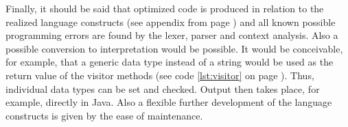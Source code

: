 Finally, it should be said that optimized code is produced in relation to the realized language constructs (see appendix from page \pageref{lst:eprogram}) and all known possible programming errors are found by the lexer, parser and context analysis. Also a possible conversion to interpretation would be possible. It would be conceivable, for example, that a generic data type instead of a string would be used as the return value of the visitor methods (see code \ref{lst:visitor} on page \pageref{lst:visitor}). Thus, individual data types can be set and checked. Output then takes place, for example, directly in Java. Also a flexible further development of the language constructs is given by the ease of maintenance.